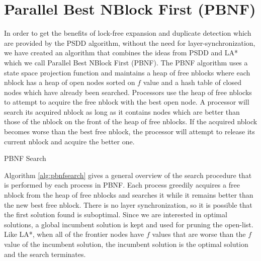 \documentclass{article}
\begin{document}
 \section{Parallel Best NBlock First (PBNF)}

 In order to get the benefits of lock-free expansion and duplicate
 detection which are provided by the PSDD algorithm, without the need
 for layer-synchronization, we have created an algorithm that combines
 the ideas from PSDD and LA* which we call Parallel Best NBlock First
 (PBNF).  The PBNF algorithm uses a state space projection function and
 maintains a heap of free nblocks where each nblock has a heap of open
 nodes sorted on $f$ value and a hash table of closed nodes which have
 already been searched.  Processors use the heap of free nblocks to
 attempt to acquire the free nblock with the best open node.  A
 processor will search its acquired nblock as long as it contains nodes
 which are better than those of the nblock on the front of the heap of
 free nblocks.  If the acquired nblock becomes worse than the best free
 nblock, the processor will attempt to release its current nblock and
 acquire the better one.

 \begin{algorithm}
   \caption{PBNF Search}
   \label{alg:pbnfsearch}
 \end{algorithm}

 Algorithm \ref{alg:pbnfsearch} gives a general overview of the search
 procedure that is performed by each process in PBNF.  Each process
 greedily acquires a free nblock from the heap of free nblocks and
 searches it while it remains better than the new best free nblock.
 There is no layer synchronization, so it is possible that the first
 solution found is suboptimal.  Since we are interested in optimal
 solutions, a global incumbent solution is kept and used for pruning
 the open-list.  Like LA*, when all of the frontier nodes have $f$
 values that are worse than the $f$ value of the incumbent solution,
 the incumbent solution is the optimal solution and the search
 terminates.
\end{document}

